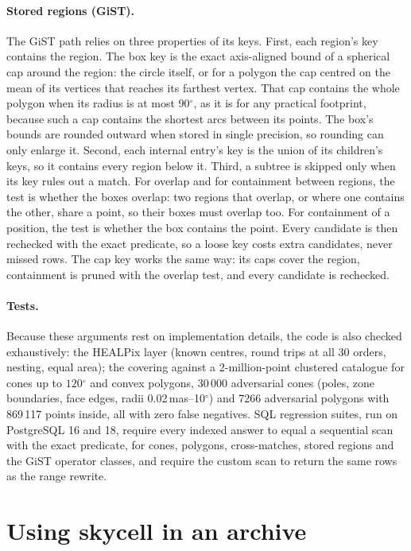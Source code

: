 \documentclass[final,5p,times,twocolumn,authoryear]{elsarticle}
\newcommand{\degr}{\ensuremath{^{\circ}}}
\begin{document}
\paragraph{Stored regions (GiST).} The GiST path relies on three properties of its
keys. First, each region's key contains the region. The box key is the exact
axis-aligned bound of a spherical cap around the region: the circle itself, or for a
polygon the cap centred on the mean of its vertices that reaches its farthest vertex.
That cap contains the whole polygon when its radius is at most $90\degr$, as it is for
any practical footprint, because such a cap contains the shortest arcs between its
points. The box's bounds are rounded outward when stored in single precision, so
rounding can only enlarge it. Second, each internal entry's key is the union of its
children's keys, so it contains every region below it. Third, a subtree is skipped only
when its key rules out a match. For overlap and for containment between regions, the
test is whether the boxes overlap: two regions that overlap, or where one contains the
other, share a point, so their boxes must overlap too. For containment of a position,
the test is whether the box contains the point. Every candidate is then rechecked with
the exact predicate, so a loose key costs extra candidates, never missed rows. The cap
key works the same way: its caps cover the region, containment is pruned with the
overlap test, and every candidate is rechecked.

\paragraph{Tests.} Because these arguments rest on implementation details, the code is
also checked exhaustively: the HEALPix layer (known centres, round trips at all 30
orders, nesting, equal area); the covering against a 2-million-point clustered catalogue
for cones up to $120\degr$ and convex polygons, 30\,000 adversarial cones (poles, zone
boundaries, face edges, radii 0.02\,mas--10\degr) and 7266 adversarial polygons with
869\,117 points inside, all with zero false negatives. SQL regression suites, run on
PostgreSQL 16 and 18, require every indexed answer to equal a sequential scan with the
exact predicate, for cones, polygons, cross-matches, stored regions and the GiST
operator classes, and require the custom scan to return the same rows as the range
rewrite.

\section{Using skycell in an archive}
\label{sec:adql}
\end{document}
